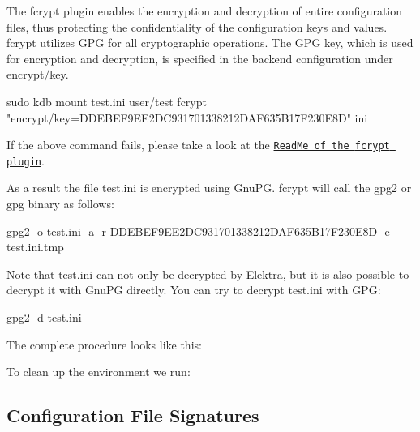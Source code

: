 The {\ttfamily fcrypt} plugin enables the encryption and decryption of entire configuration files, thus protecting the confidentiality of the configuration keys and values. {\ttfamily fcrypt} utilizes G\+PG for all cryptographic operations. The G\+PG key, which is used for encryption and decryption, is specified in the backend configuration under {\ttfamily encrypt/key}. \begin{DoxyVerb}sudo kdb mount test.ini user/test fcrypt "encrypt/key=DDEBEF9EE2DC931701338212DAF635B17F230E8D" ini
\end{DoxyVerb}


If the above command fails, please take a look at the \href{https://master.libelektra.org/src/plugins/fcrypt/README.md#known-issues}{\tt Read\+Me of the {\ttfamily fcrypt} plugin}.

As a result the file {\ttfamily test.\+ini} is encrypted using Gnu\+PG. {\ttfamily fcrypt} will call the {\ttfamily gpg2} or {\ttfamily gpg} binary as follows\+: \begin{DoxyVerb}gpg2 -o test.ini -a -r DDEBEF9EE2DC931701338212DAF635B17F230E8D -e test.ini.tmp
\end{DoxyVerb}


Note that {\ttfamily test.\+ini} can not only be decrypted by Elektra, but it is also possible to decrypt it with Gnu\+PG directly. You can try to decrypt {\ttfamily test.\+ini} with G\+PG\+: \begin{DoxyVerb}gpg2 -d test.ini
\end{DoxyVerb}


The complete procedure looks like this\+:




To clean up the environment we run\+:




\subsection*{Configuration File Signatures}

